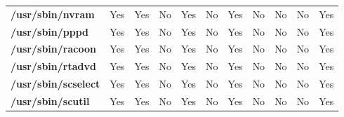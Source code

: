 \begin{center}
{\begin{tabular}{|>{\bfseries} l | C | C | C | C | C | C | C | C | C | C |}
					/usr/sbin/nvram & Yes & Yes & \color{green}No & \color{red}Yes & \color{green}No & \color{red}Yes & No & No & \color{green}No & \color{red}Yes\\ 
					/usr/sbin/pppd & Yes & Yes & \color{green}No & \color{red}Yes & \color{green}No & \color{red}Yes & No & No & \color{green}No & \color{red}Yes\\ 
					/usr/sbin/racoon & Yes & Yes & \color{green}No & \color{red}Yes & \color{green}No & \color{red}Yes & No & No & \color{green}No & \color{red}Yes\\ 
					/usr/sbin/rtadvd & Yes & Yes & \color{green}No & \color{red}Yes & \color{green}No & \color{red}Yes & No & No & \color{green}No & \color{red}Yes\\ 
					/usr/sbin/scselect & Yes & Yes & \color{green}No & \color{red}Yes & \color{green}No & \color{red}Yes & No & No & \color{green}No & \color{red}Yes\\ 
					/usr/sbin/scutil & Yes & Yes & \color{green}No & \color{red}Yes & \color{green}No & \color{red}Yes & No & No & \color{green}No & \color{red}Yes\\ 

			\end{tabular}
		}
	\end{center}


